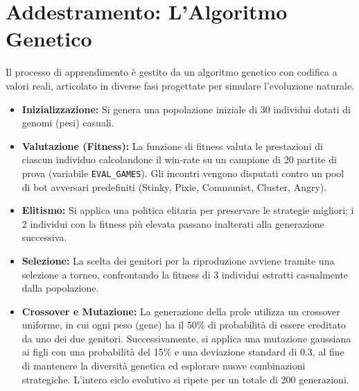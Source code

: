 \documentclass[12pt,a4paper]{article}
\begin{document}
\section{Addestramento: L'Algoritmo Genetico}
Il processo di apprendimento è gestito da un algoritmo genetico con codifica a valori reali, articolato in diverse fasi progettate per simulare l'evoluzione naturale.
\begin{itemize}
    \item \textbf{Inizializzazione:} Si genera una popolazione iniziale di 30 individui dotati di genomi (pesi) casuali.
    \item \textbf{Valutazione (Fitness):} La funzione di fitness valuta le prestazioni di ciascun individuo calcolandone il win-rate su un campione di 20 partite di prova (variabile \texttt{EVAL\_GAMES}). Gli incontri vengono disputati contro un pool di bot avversari predefiniti (Stinky, Pixie, Communist, Cluster, Angry).
    \item \textbf{Elitismo:} Si applica una politica elitaria per preservare le strategie migliori; i 2 individui con la fitness più elevata passano inalterati alla generazione successiva.
    \item \textbf{Selezione:} La scelta dei genitori per la riproduzione avviene tramite una selezione a torneo, confrontando la fitness di 3 individui estratti casualmente dalla popolazione.
    \item \textbf{Crossover e Mutazione:} La generazione della prole utilizza un crossover uniforme, in cui ogni peso (gene) ha il 50\% di probabilità di essere ereditato da uno dei due genitori. Successivamente, si applica una mutazione gaussiana ai figli con una probabilità del 15\% e una deviazione standard di 0.3, al fine di mantenere la diversità genetica ed esplorare nuove combinazioni strategiche. L'intero ciclo evolutivo si ripete per un totale di 200 generazioni.
\end{itemize}
\end{document}
